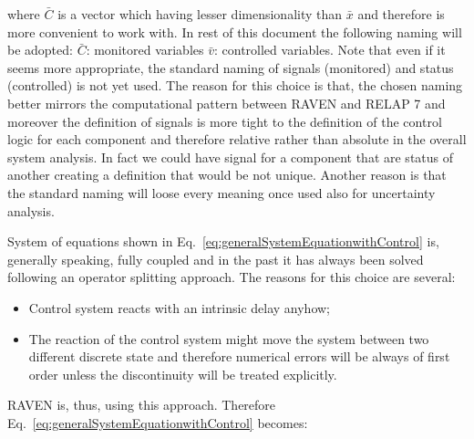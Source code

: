 \documentclass{mc2013}
\begin{document}
where 
$\bar{C}$
is a vector which having lesser dimensionality than
$\bar{x}$
and therefore is more convenient to work with. In rest of this document the following naming will be adopted: $\bar{C}$: monitored variables $\bar{v}$:
controlled variables.
Note that even if it seems more appropriate, the standard naming of signals (monitored)
and status (controlled) is not yet used. The reason for this choice is that, the chosen naming better mirrors
the computational pattern between RAVEN and RELAP 7 and moreover the definition of signals is more
tight to the definition of the control logic for each component and therefore relative rather than absolute in
the overall system analysis. In fact we could have signal for a component that are status of another creating
a definition that would be not unique. Another reason is that the standard naming will loose every meaning
once used also for uncertainty analysis.

\label{sec:operatorSplitting}

System of equations shown in Eq.~\ref{eq:generalSystemEquationwithControl} is, generally speaking, fully coupled and in the past it has always been solved following an operator splitting approach. The reasons for this choice are several:

\begin{itemize}
\item Control system reacts with an intrinsic delay anyhow;
\item The reaction of the control system might move the system between two different discrete state and
therefore numerical errors will be always of first order unless the discontinuity will be treated explicitly.
\end{itemize}

RAVEN is, thus, using this approach. Therefore Eq.~\ref{eq:generalSystemEquationwithControl} becomes:
\end{document}
